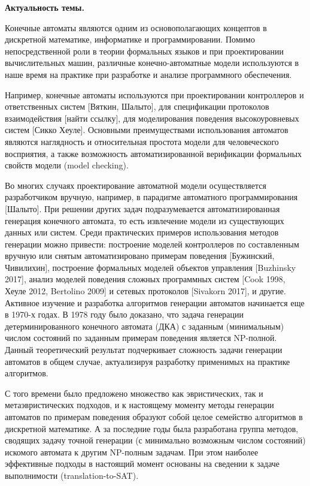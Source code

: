 \textbf{Актуальность темы.} 

Конечные автоматы являются одним из основополагающих концептов в дискретной математике, информатике и программировании.
Помимо непосредственной роли в теории формальных языков и при проектировании вычислительных машин, различные конечно-автоматные модели используются в наше время на практике при разработке и анализе программного обеспечения.

Например, конечные автоматы используются при проектировании контроллеров и ответственных систем [Вяткин, Шалыто], для спецификации протоколов взаимодействия [найти ссылку], для моделирования поведения высокоуровневых систем [Сикко Хеуле].
Основными преимуществами использования автоматов являются наглядность и относительная простота модели для человеческого восприятия, а также возможность автоматизированной верификации формальных свойств модели (model checking).

Во многих случаях проектирование автоматной модели осуществляется разработчиком вручную, например, в парадигме автоматного программирования [Шалыто].
При решении других задач подразумевается автоматизированная генерация конечного автомата, то есть извлечение модели из существующих данных или систем.
Среди практических примеров использования методов генерации можно привести: построение моделей контроллеров по составленным вручную или снятым автоматизировано примерам поведения [Бужинский, Чивилихин], построение формальных моделей объектов управления [Buzhinsky 2017], анализ моделей поведения сложных программных систем [Cook 1998, Хеуле 2012, Bertolino 2009] и сетевых протоколов [Sivakorn 2017], и другие.
Активное изучение и разработка алгоритмов генерации автоматов начинается еще в 1970-х годах.
В 1978 году было доказано, что задача генерации детерминированного конечного автомата (ДКА) с заданным (минимальным) числом состояний по заданным примерам поведения является NP-полной.
Данный теоретический результат подчеркивает сложность задачи генерации автоматов в общем случае, актуализируя разработку применимых на практике алгоритмов.

С того времени было предложено множество как эвристических, так и метаэвристических подходов, и к настоящему моменту методы генерации автоматов по примерам поведения образуют собой целое семейство алгоритмов в дискретной математике. А за последние годы была разработана группа методов, сводящих задачу точной генерации (с минимально возможным числом состояний) искомого автомата к другим NP-полным задачам. При этом наиболее эффективные подходы в настоящий момент основаны на сведении к задаче выполнимости (translation-to-SAT).

